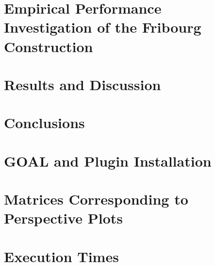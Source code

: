 \documentclass[a4paper,table]{report}
\newcommand{\goal}{GOAL}
\begin{document}
\chapter{Empirical Performance Investigation of the Fribourg Construction}
\label{chap_investigation}
\minitoc
\newpage


\chapter{Results and Discussion}
\label{chap_results}
\minitoc
\newpage


\chapter{Conclusions}
\label{chap_conclusions}
\newpage
% 


\appendix
\chapter{\goal{} and Plugin Installation}
\label{app_plugin}


\chapter{Matrices Corresponding to Perspective Plots}
\label{app_matrices}


\chapter{Execution Times}
\label{app_times}








\end{document}
